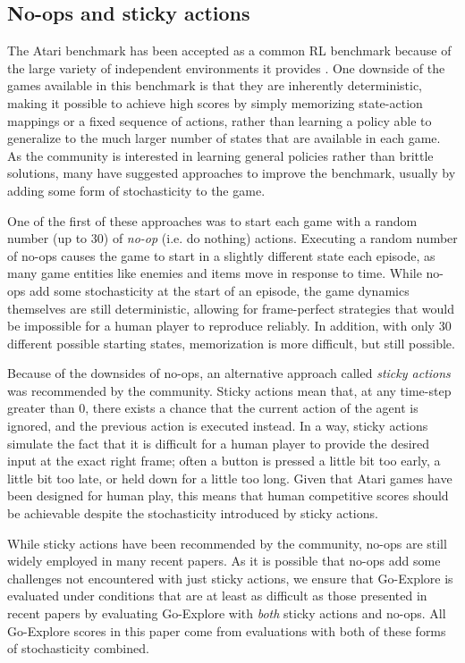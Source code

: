 \documentclass{nature}
\renewcommand*{\cite}[1]{\supercite{#1}}
\begin{document}
\subsection{No-ops and sticky actions}

The Atari benchmark has been accepted as a common RL benchmark because of the large variety of independent environments it provides \cite{bellemare2013arcade}.
One downside of the games available in this benchmark is that they are inherently deterministic, making it possible to achieve high scores by simply memorizing state-action mappings or a fixed sequence of actions, rather than learning a policy able to generalize to the much larger number of states that are available in each game.
As the community is interested in learning general policies rather than brittle solutions, many have suggested approaches to improve the benchmark, usually by adding some form of stochasticity to the game\cite{Machado2018RevisitingTA}.

One of the first of these approaches was to start each game with a random number (up to 30) of \emph{no-op} (i.e. do nothing) actions\cite{mnih:nature15}.
Executing a random number of no-ops causes the game to start in a slightly different state each episode, as many game entities like enemies and items move in response to time.
While no-ops add some stochasticity at the start of an episode, the game dynamics themselves are still deterministic, allowing for frame-perfect strategies that would be impossible for a human player to reproduce reliably.
In addition, with only 30 different possible starting states, memorization is more difficult, but still possible.

Because of the downsides of no-ops, an alternative approach called \emph{sticky actions} was recommended by the community\cite{Machado2018RevisitingTA}.
Sticky actions mean that, at any time-step greater than 0, there exists a  chance that the current action of the agent is ignored, and the previous action is executed instead.
In a way, sticky actions simulate the fact that it is difficult for a human player to provide the desired input at the exact right frame; often a button is pressed a little bit too early, a little bit too late, or held down for a little too long.
Given that Atari games have been designed for human play, this means that human competitive scores should be achievable despite the stochasticity introduced by sticky actions.

While sticky actions have been recommended by the community, no-ops are still widely employed in many recent papers\cite{puigdomenech2020never, badia2020agent57}.
As it is possible that no-ops add some challenges not encountered with just sticky actions, we ensure that Go-Explore is evaluated under conditions that are at least as difficult as those presented in recent papers by evaluating Go-Explore with \emph{both} sticky actions and no-ops. All Go-Explore scores in this paper come from evaluations with both of these forms of stochasticity combined.
\end{document}
